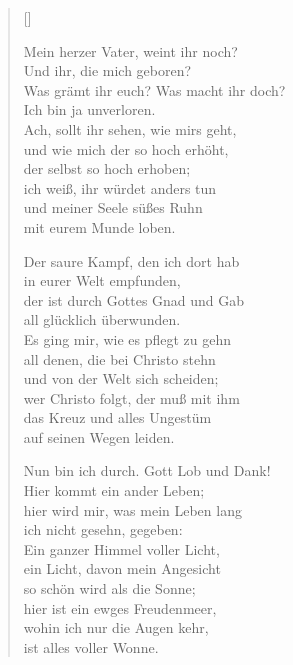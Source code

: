 \begin{multicols}{2}
\settowidth{\versewidth}{Nichts ist so schön und wohl bestellt,}
\begin{verse}[\versewidth]

 Mein herzer Vater, weint ihr noch?\\
Und ihr, die mich geboren?\\
Was grämt ihr euch? Was macht ihr doch?\\
Ich bin ja unverloren.\\
Ach, sollt ihr sehen, wie mirs geht,\\
und wie mich der so hoch erhöht,\\
der selbst so hoch erhoben;\\
ich weiß, ihr würdet anders tun\\
und meiner Seele süßes Ruhn\\
mit eurem Munde loben.

 Der saure Kampf, den ich dort hab\\
in eurer Welt empfunden,\\
der ist durch Gottes Gnad und Gab\\
all glücklich überwunden.\\
Es ging mir, wie es pflegt zu gehn\\
all denen, die bei Christo stehn\\
und von der Welt sich scheiden;\\
wer Christo folgt, der muß mit ihm\\
das Kreuz und alles Ungestüm\\
auf seinen Wegen leiden.

 Nun bin ich durch. Gott Lob und Dank!\\
Hier kommt ein ander Leben;\\
hier wird mir, was mein Leben lang\\
ich nicht gesehn, gegeben:\\
Ein ganzer Himmel voller Licht,\\
ein Licht, davon mein Angesicht\\
so schön wird als die Sonne;\\
hier ist ein ewges Freudenmeer,\\
wohin ich nur die Augen kehr,\\
ist alles voller Wonne.


\end{verse}
\end{multicols}
